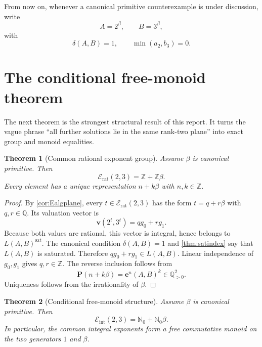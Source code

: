 \documentclass[11pt]{article}
\numberwithin{equation}{section}
\newtheorem{theorem}{Theorem}[section]
\theoremstyle{definition}
\newcommand{\Q}{\mathbb{Q}}
\newcommand{\Z}{\mathbb{Z}}
\newcommand{\N}{\mathbb{N}}
\newcommand{\val}{\boldsymbol{v}}
\newcommand{\sat}{\operatorname{sat}}
\newcommand{\Pair}{\mathbf P}
\newcommand{\axis}{\mathbf e}
\newcommand{\defect}{\delta}
\newcommand{\Erat}{\mathcal E_{\mathrm{rat}}}
\newcommand{\Eint}{\mathcal E_{\mathrm{int}}}
\begin{document}
From now on, whenever a canonical primitive counterexample is under discussion, write
\begin{equation}\label{eq:canonicalpair}
       A=2^\beta,\qquad B=3^\beta,
\end{equation}
with
\begin{equation}\label{eq:canonicalshort}
       \defect(A,B)=1,
       \qquad
       \min(a_2,b_3)=0.
\end{equation}

\section{The conditional free-monoid theorem}

The next theorem is the strongest structural result of this report. It turns the vague phrase ``all further solutions lie in the same rank-two plane'' into exact group and monoid equalities.

\begin{theorem}[Common rational exponent group]\label{thm:rationalgroup}
Assume \(\beta\) is canonical primitive. Then
\begin{equation}\label{eq:Erat}
       \Erat(2,3)=\Z+\Z\beta.
\end{equation}
Every element has a unique representation \(n+k\beta\) with \(n,k\in\Z\).
\end{theorem}

\begin{proof}
By \cref{cor:Ealgplane}, every \(t\in\Erat(2,3)\) has the form \(t=q+r\beta\) with \(q,r\in\Q\). Its valuation vector is
\[
     \val(2^t,3^t)=qg_0+rg_1.
\]
Because both values are rational, this vector is integral, hence belongs to \(L(A,B)^{\sat}\). The canonical condition \(\defect(A,B)=1\) and \cref{thm:satindex} say that \(L(A,B)\) is saturated. Therefore \(qg_0+rg_1\in L(A,B)\). Linear independence of \(g_0,g_1\) gives \(q,r\in\Z\). The reverse inclusion follows from
\[
  \Pair(n+k\beta)=\axis^n(A,B)^k\in\Q_{>0}^2.
\]
Uniqueness follows from the irrationality of \(\beta\).
\end{proof}

\begin{theorem}[Conditional free-monoid structure]\label{thm:freemonoid}
Assume \(\beta\) is canonical primitive. Then
\begin{equation}\label{eq:Eintmonoid}
       \Eint(2,3)=\N_0+\N_0\beta.
\end{equation}
In particular, the common integral exponents form a free commutative monoid on the two generators \(1\) and \(\beta\).
\end{theorem}
\end{document}
